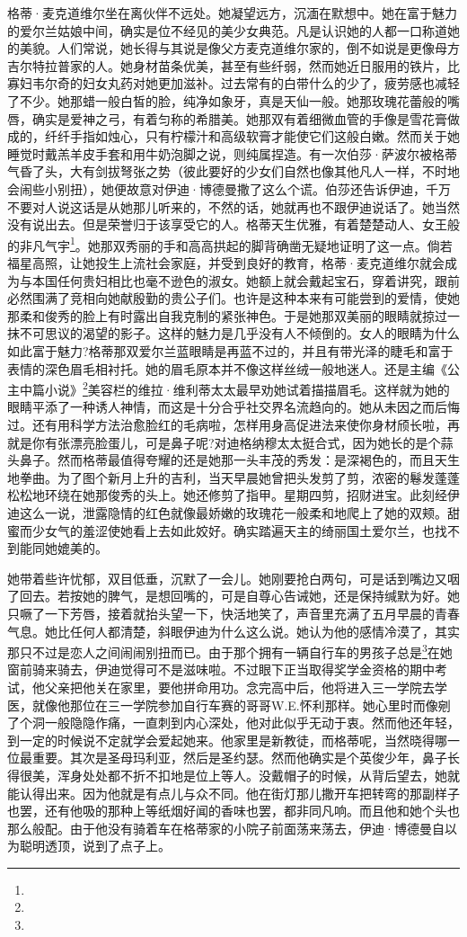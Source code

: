 \par 格蒂·麦克道维尔坐在离伙伴不远处。她凝望远方，沉湎在默想中。她在富于魅力的爱尔兰姑娘中间，确实是位不经见的美少女典范。凡是认识她的人都一口称道她的美貌。人们常说，她长得与其说是像父方麦克道维尔家的，倒不如说是更像母方吉尔特拉普家的人。她身材苗条优美，甚至有些纤弱，然而她近日服用的铁片，比寡妇韦尔奇的妇女丸药对她更加滋补。过去常有的白带什么的少了，疲劳感也减轻了不少。她那蜡一般白皙的脸，纯净如象牙，真是天仙一般。她那玫瑰花蕾般的嘴唇，确实是爱神之弓，有着匀称的希腊美。她那双有着细微血管的手像是雪花膏做成的，纤纤手指如烛心，只有柠檬汁和高级软膏才能使它们这般白嫩。然而关于她睡觉时戴羔羊皮手套和用牛奶泡脚之说，则纯属捏造。有一次伯莎·萨波尔被格蒂气昏了头，大有剑拔弩张之势（彼此要好的少女们自然也像其他凡人一样，不时地会闹些小别扭），她便故意对伊迪·博德曼撒了这么个谎。伯莎还告诉伊迪，千万不要对人说这话是从她那儿听来的，不然的话，她就再也不跟伊迪说话了。她当然没有说出去。但是荣誉归于该享受它的人。格蒂天生优雅，有着楚楚动人、女王般的非凡气宇\footnote{}。她那双秀丽的手和高高拱起的脚背确凿无疑地证明了这一点。倘若福星高照，让她投生上流社会家庭，并受到良好的教育，格蒂·麦克道维尔就会成为与本国任何贵妇相比也毫不逊色的淑女。她额上就会戴起宝石，穿着讲究，跟前必然围满了竞相向她献殷勤的贵公子们。也许是这种本来有可能尝到的爱情，使她那柔和俊秀的脸上有时露出自我克制的紧张神色。于是她那双美丽的眼睛就掠过一抹不可思议的渴望的影子。这样的魅力是几乎没有人不倾倒的。女人的眼睛为什么如此富于魅力?格蒂那双爱尔兰蓝眼睛是再蓝不过的，并且有带光泽的睫毛和富于表情的深色眉毛相衬托。她的眉毛原本并不像这样丝绒一般地迷人。还是主编《公主中篇小说》\footnote{}美容栏的维拉·维利蒂太太最早劝她试着描描眉毛。这样就为她的眼睛平添了一种诱人神情，而这是十分合乎社交界名流趋向的。她从未因之而后悔过。还有用科学方法治愈脸红的毛病啦，怎样用身高促进法来使你身材颀长啦，再就是你有张漂亮脸蛋儿，可是鼻子呢?对迪格纳穆太太挺合式，因为她长的是个蒜头鼻子。然而格蒂最值得夸耀的还是她那一头丰茂的秀发：是深褐色的，而且天生地拳曲。为了图个新月上升的吉利，当天早晨她曾把头发剪了剪，浓密的鬈发蓬蓬松松地环绕在她那俊秀的头上。她还修剪了指甲。星期四剪，招财进宝。此刻经伊迪这么一说，泄露隐情的红色就像最娇嫩的玫瑰花一般柔和地爬上了她的双颊。甜蜜而少女气的羞涩使她看上去如此姣好。确实踏遍天主的绮丽国土爱尔兰，也找不到能同她媲美的。
\par 她带着些许忧郁，双目低垂，沉默了一会儿。她刚要抢白两句，可是话到嘴边又咽了回去。若按她的脾气，是想回嘴的，可是自尊心告诫她，还是保持缄默为好。她只噘了一下芳唇，接着就抬头望一下，快活地笑了，声音里充满了五月早晨的青春气息。她比任何人都清楚，斜眼伊迪为什么这么说。她认为他的感情冷漠了，其实那只不过是恋人之间闹闹别扭而已。由于那个拥有一辆自行车的男孩子总是\footnote{}在她窗前骑来骑去，伊迪觉得可不是滋味啦。不过眼下正当取得奖学金资格的期中考试，他父亲把他关在家里，要他拼命用功。念完高中后，他将进入三一学院去学医，就像他那位在三一学院参加自行车赛的哥哥W.E.怀利那样。她心里时而像剜了个洞一般隐隐作痛，一直刺到内心深处，他对此似乎无动于衷。然而他还年轻，到一定的时候说不定就学会爱起她来。他家里是新教徒，而格蒂呢，当然晓得哪一位最重要。其次是圣母玛利亚，然后是圣约瑟。然而他确实是个英俊少年，鼻子长得很美，浑身处处都不折不扣地是位上等人。没戴帽子的时候，从背后望去，她就能认得出来。因为他就是有点儿与众不同。他在街灯那儿撒开车把转弯的那副样子也罢，还有他吸的那种上等纸烟好闻的香味也罢，都非同凡响。而且他和她个头也那么般配。由于他没有骑着车在格蒂家的小院子前面荡来荡去，伊迪·博德曼自以为聪明透顶，说到了点子上。
